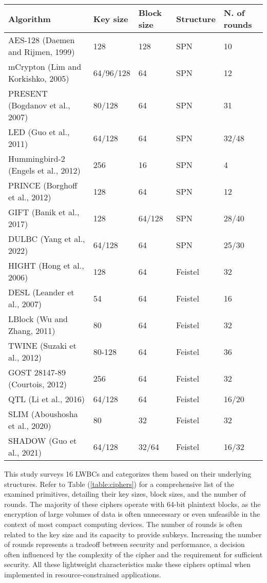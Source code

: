 \documentclass[conference,compsoc]{IEEEtran}
\begin{document}
\begin{table*}[ht]
    \label{table:ciphers}
    \centering
    \caption{Lightweight Block Ciphers}
    \begin{tabular}{lllll} 
     \toprule
     Algorithm & Key size & Block size & Structure & N. of rounds \\ 
     \midrule
     AES-128 (Daemen and Rijmen, 1999)\cite{AES-128}\cite{AES} & 128 & 128 & SPN & 10 \\ 
     mCrypton (Lim and Korkishko, 2005)\cite{MCRYPTON} & 64/96/128 & 64 & SPN & 12 \\
     PRESENT (Bogdanov et al., 2007)\cite{PRESENT} & 80/128 & 64 & SPN & 31 \\
     LED (Guo et al., 2011)\cite{LED} & 64/128 & 64 & SPN & 32/48 \\
     Hummingbird-2 (Engels et al., 2012)\cite{HUMMINGBIRD2} & 256 & 16 & SPN & 4 \\
     PRINCE (Borghoff et al., 2012)\cite{PRINCE} & 128 & 64 & SPN & 12 \\
     GIFT (Banik et al., 2017)\cite{GIFT} & 128 & 64/128 & SPN & 28/40 \\
     DULBC (Yang et al., 2022) \cite{DULBC} & 64/128 & 64 & SPN & 25/30 \\
     HIGHT (Hong et al., 2006)\cite{HIGHT} & 128 & 64 & Feistel & 32 \\
     DESL (Leander et al., 2007)\cite{DESL} & 54 & 64 & Feistel & 16 \\
     LBlock (Wu and Zhang, 2011)\cite{LBLOCK} & 80 & 64 & Feistel & 32 \\
     TWINE (Suzaki et al., 2012)\cite{TWINE} & 80-128 & 64 & Feistel & 36 \\
     GOST 28147-89 (Courtois, 2012)\cite{GOST} & 256 & 64 & Feistel & 32 \\
     QTL (Li et al., 2016)\cite{QTL} & 64/128 & 64 & Feistel & 16/20 \\
     SLIM (Aboushosha et al., 2020)\cite{SLIM} & 80 & 32 & Feistel & 32 \\
     SHADOW (Guo et al., 2021)\cite{SHADOW} & 64/128 & 32/64 & Feistel & 16/32 \\
     \bottomrule
    \end{tabular}
\end{table*}

This study surveys 16 LWBCs and categorizes them based on their underlying structures. Refer to Table (\ref{table:ciphers}) for a comprehensive list of the examined primitives, detailing their key sizes, block sizes, and the number of rounds. The majority of these ciphers operate with 64-bit plaintext blocks, as the encryption of large volumes of data is often unnecessary or even unfeasible in the context of most compact computing devices. The number of rounds is often related to the key size and its capacity to provide subkeys. Increasing the number of rounds represents a tradeoff between security and performance, a decision often influenced by the complexity of the cipher and the requirement for sufficient security. All these lightweight characteristics make these ciphers optimal when implemented in resource-constrained applications.
\end{document}
